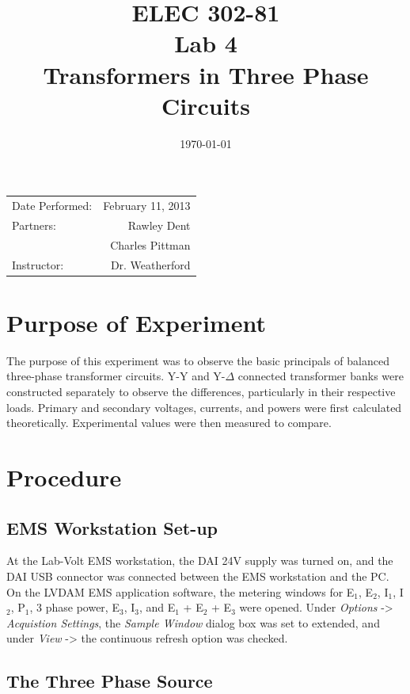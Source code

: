 \documentclass{article}
\title{ELEC 302-81\\ Lab 4\\ Transformers in Three Phase Circuits}
\date{\today}
\begin{document}
\maketitle

\begin{center}
  \begin{tabular}{lr}
    Date Performed: & February 11, 2013 \\
    Partners: & Rawley Dent \\
              & Charles Pittman \\
    Instructor: & Dr. Weatherford
  \end{tabular}
\end{center}

\pagebreak

\setlength\parindent{0pt} 

\section{Purpose of Experiment}

The purpose of this experiment was to observe the basic principals of balanced
three-phase transformer circuits. Y-Y and Y-$\Delta$ connected transformer banks 
were constructed separately to observe the differences, particularly in their 
respective loads. Primary and secondary voltages, currents, and powers were first 
calculated theoretically. Experimental values were then measured to compare. 

\section{Procedure}

\subsection{EMS Workstation Set-up}

At the Lab-Volt EMS workstation, the DAI 24V supply was turned on, and the DAI USB
connector was connected between the EMS workstation and the {PC}. On the LVDAM
EMS application software, the metering windows for E$_1$, E$_2$, I$_1$, I$_2$, 
P$_1$, 3 phase power, E$_3$, I$_3$, and E$_1$ + E$_2$ + E$_3$ were opened. 
Under \emph{Options} -> \emph{Acquistion Settings}, the \emph{Sample Window} dialog box 
was set to extended, and under \emph{View} -> the continuous refresh option was checked.

\subsection{The Three Phase Source}
\end{document}
